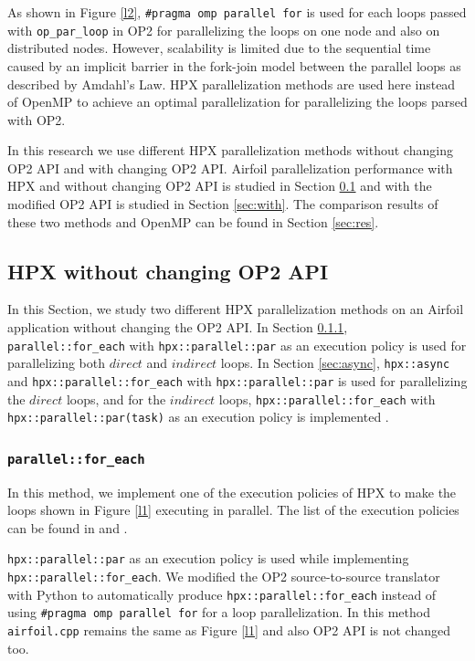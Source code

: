 \documentclass[conference]{IEEEtran}
\begin{document}
As shown in Figure \ref{l2}, \texttt{\#pragma omp parallel for} is used for each loops passed with \texttt{op\_par\_loop} in OP2 for parallelizing the loops on one node and also on distributed nodes. However, scalability is limited due to the sequential time caused by an implicit barrier in the fork-join model \cite{r23} between the parallel loops as described by Amdahl's Law. HPX parallelization methods are used here instead of OpenMP to achieve an optimal parallelization for parallelizing the loops parsed with OP2. 

In this research we use different HPX parallelization methods without changing OP2 API and with changing OP2 API. Airfoil parallelization performance with HPX and without changing OP2 API is studied in Section \ref{sec:without} and with the modified OP2 API is studied in Section \ref{sec:with}. The comparison results of these two methods and OpenMP can be found in Section \ref{sec:res}.

\subsection{\textbf{HPX without changing OP2 API}}
\label{sec:without}

In this Section, we study two different HPX parallelization methods on an Airfoil application without changing the OP2 API. In Section \ref{sec:for}, \texttt{parallel::for\_each} with \texttt{hpx::parallel::par} as an execution policy is used for parallelizing both $direct$ and $indirect$ loops. In Section \ref{sec:async}, \texttt{hpx::async} and \texttt{hpx::parallel::for\_each} with \texttt{hpx::parallel::par} is used for parallelizing the $direct$ loops, and for the $indirect$ loops, \texttt{hpx::parallel::for\_each} with \texttt{hpx::parallel::par(task)} as an execution policy is implemented . 



\subsubsection{\textbf{\texttt{parallel::for\_each}}}
\label{sec:for}

In this method, we implement one of the execution policies of HPX to make the loops shown in Figure \ref{l1} executing in parallel. The list of the execution policies can be found in \cite{p1} and \cite{hpx_v0.9.11}. 

\texttt{hpx::parallel::par} as an execution policy is used while implementing \texttt{hpx::parallel::for\_each}. We modified the OP2 source-to-source translator with Python to automatically produce \texttt{hpx::parallel::for\_each} instead of using \texttt{\#pragma omp parallel for} for a loop parallelization. In this method \texttt{airfoil.cpp} remains the same as Figure \ref{l1} and also OP2 API is not changed too.
\end{document}
